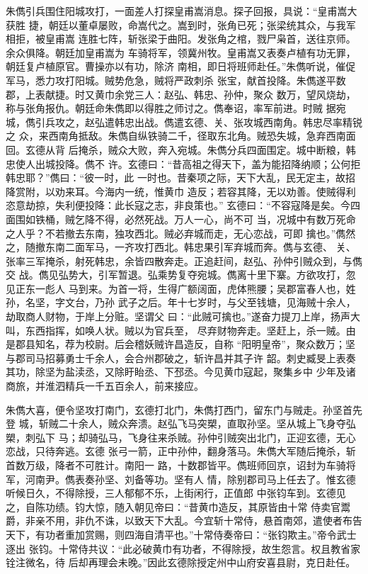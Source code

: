 朱儁引兵围住阳城攻打，一面差人打探皇甫嵩消息。探子回报，具说：“皇甫嵩大获胜
捷，朝廷以董卓屡败，命嵩代之。嵩到时，张角已死；张梁统其众，与我军相拒，被皇甫嵩
连胜七阵，斩张梁于曲阳。发张角之棺，戮尸枭首，送往京师。余众俱降。朝廷加皇甫嵩为
车骑将军，领冀州牧。皇甫嵩又表奏卢植有功无罪，朝廷复卢植原官。曹操亦以有功，除济
南相，即日将班师赴任。”朱儁听说，催促军马，悉力攻打阳城。贼势危急，贼将严政刺杀
张宝，献首投降。朱儁遂平数郡，上表献捷。时又黄巾余党三人：赵弘、韩忠、孙仲，聚众
数万，望风烧劫，称与张角报仇。朝廷命朱儁即以得胜之师讨之。儁奉诏，率军前进。时贼
据宛城，儁引兵攻之，赵弘遣韩忠出战。儁遣玄德、关、张攻城西南角。韩忠尽率精锐之
众，来西南角抵敌。朱儁自纵铁骑二千，径取东北角。贼恐失城，急弃西南面回。玄德从背
后掩杀，贼众大败，奔入宛城。朱儁分兵四面围定。城中断粮，韩忠使人出城投降。儁不
许。玄德曰：“昔高祖之得天下，盖为能招降纳顺；公何拒韩忠耶？”儁曰：“彼一时，此
一时也。昔秦项之际，天下大乱，民无定主，故招降赏附，以劝来耳。今海内一统，惟黄巾
造反；若容其降，无以劝善。使贼得利恣意劫掠，失利便投降：此长寇之志，非良策也。”
玄德曰：“不容寇降是矣。今四面围如铁桶，贼乞降不得，必然死战。万人一心，尚不可
当，况城中有数万死命之人乎？不若撤去东南，独攻西北。贼必弃城而走，无心恋战，可即
擒也。”儁然之，随撤东南二面军马，一齐攻打西北。韩忠果引军弃城而奔。儁与玄德、
关、张率三军掩杀，射死韩忠，余皆四散奔走。正追赶间，赵弘、孙仲引贼众到，与儁交
战。儁见弘势大，引军暂退。弘乘势复夺宛城。儁离十里下寨。方欲攻打，忽见正东一彪人
马到来。为首一将，生得广额阔面，虎体熊腰；吴郡富春人也，姓孙，名坚，字文台，乃孙
武子之后。年十七岁时，与父至钱塘，见海贼十余人，劫取商人财物，于岸上分赃。坚谓父
曰：“此贼可擒也。”遂奋力提刀上岸，扬声大叫，东西指挥，如唤人状。贼以为官兵至，
尽弃财物奔走。坚赶上，杀一贼。由是郡县知名，荐为校尉。后会稽妖贼许昌造反，自称
“阳明皇帝”，聚众数万；坚与郡司马招募勇士千余人，会合州郡破之，斩许昌并其子许
韶。刺史臧旻上表奏其功，除坚为盐渎丞，又除盱眙丞、下邳丞。今见黄巾寇起，聚集乡中
少年及诸商旅，并淮泗精兵一千五百余人，前来接应。

朱儁大喜，便令坚攻打南门，玄德打北门，朱儁打西门，留东门与贼走。孙坚首先登
城，斩贼二十余人，贼众奔溃。赵弘飞马突槊，直取孙坚。坚从城上飞身夺弘槊，刺弘下
马；却骑弘马，飞身往来杀贼。孙仲引贼突出北门，正迎玄德，无心恋战，只待奔逃。玄德
张弓一箭，正中孙仲，翻身落马。朱儁大军随后掩杀，斩首数万级，降者不可胜计。南阳一
路，十数郡皆平。儁班师回京，诏封为车骑将军，河南尹。儁表奏孙坚、刘备等功。坚有人
情，除别郡司马上任去了。惟玄德听候日久，不得除授，三人郁郁不乐，上街闲行，正值郎
中张钧车到。玄德见之，自陈功绩。钧大惊，随入朝见帝曰：“昔黄巾造反，其原皆由十常
侍卖官鬻爵，非亲不用，非仇不诛，以致天下大乱。今宜斩十常侍，悬首南郊，遣使者布告
天下，有功者重加赏赐，则四海自清平也。”十常侍奏帝曰：“张钧欺主。”帝令武士逐出
张钧。十常侍共议：“此必破黄巾有功者，不得除授，故生怨言。权且教省家铨注微名，待
后却再理会未晚。”因此玄德除授定州中山府安喜县尉，克日赴任。

